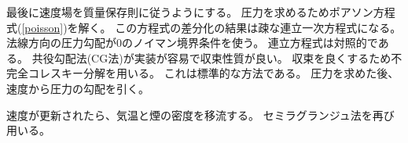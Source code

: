 \documentclass{ujarticle}
\begin{document}
最後に速度場を質量保存則に従うようにする。
圧力を求めるためポアソン方程式(\ref{poisson})を解く。
この方程式の差分化の結果は疎な連立一次方程式になる。
法線方向の圧力勾配が0のノイマン境界条件を使う。
連立方程式は対照的である。
共役勾配法(CG法)が実装が容易で収束性質が良い。
収束を良くするため不完全コレスキー分解を用いる。
これは標準的な方法である。
圧力を求めた後、速度から圧力の勾配を引く。

速度が更新されたら、気温と煙の密度を移流する。
セミラグランジュ法を再び用いる。


\end{document}
